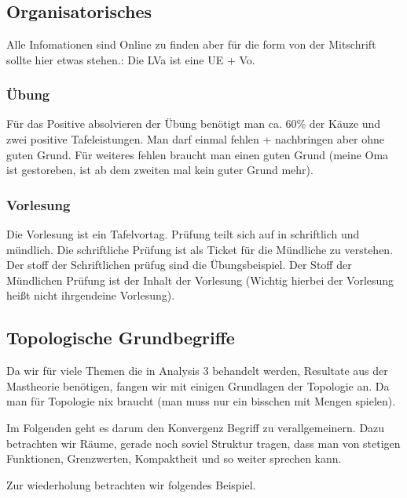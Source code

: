 \chapter{}
\section{Organisatorisches}
Alle Infomationen sind Online zu finden aber für die form von der Mitschrift sollte hier etwas stehen.:
Die LVa ist eine UE + Vo. 
\subsection{Übung}
Für das Positive absolvieren der Übung benötigt man ca. 60\% der Käuze und zwei positive Tafeleistungen.
Man darf einmal fehlen + nachbringen aber ohne guten Grund.
Für weiteres fehlen braucht man einen guten Grund (meine Oma ist gestoreben,
ist ab dem zweiten mal kein guter Grund mehr).
\subsection{Vorlesung}
Die Vorlesung ist ein Tafelvortag. 
Prüfung teilt sich auf in schriftlich und mündlich. Die schriftliche Prüfung ist als Ticket für die Mündliche zu verstehen.
Der stoff der Schriftlichen prüfug sind die Übungsbeispiel.
Der Stoff der Mündlichen Prüfung ist der Inhalt der Vorlesung (Wichtig hierbei der Vorlesung heißt nicht ihrgendeine Vorlesung).

\section{Topologische Grundbegriffe} 

Da wir für viele Themen die in Analysis 3 behandelt werden, Resultate aus der Mastheorie benötigen,
fangen wir mit einigen Grundlagen der Topologie an. Da man für Topologie nix braucht (man muss nur ein bisschen mit Mengen spielen).

\bigskip

Im Folgenden geht es darum den Konvergenz Begriff zu verallgemeinern. 
Dazu betrachten wir Räume, gerade noch soviel Struktur tragen, dass man von stetigen
Funktionen, Grenzwerten, Kompaktheit und so weiter sprechen kann.

Zur wiederholung betrachten wir folgendes Beispiel. 

